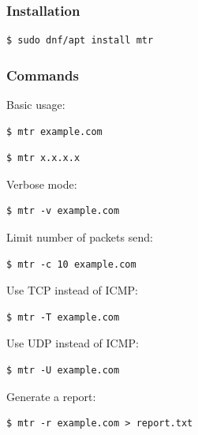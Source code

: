 \documentclass{article}
\newenvironment{codetemplate}[1][]{%
  \mybasecolorbox[#1]
  \itshape
}{%
  \endmybasecolorbox
}
\begin{document}
\subsubsection{Installation}

\begin{codetemplate}
\begin{verbatim}
$ sudo dnf/apt install mtr
\end{verbatim}
\end{codetemplate}

\subsubsection{Commands}

Basic usage:
\begin{codetemplate}
\begin{verbatim}
$ mtr example.com
\end{verbatim}
\end{codetemplate}
\begin{codetemplate}
\begin{verbatim}
$ mtr x.x.x.x
\end{verbatim}
\end{codetemplate}

Verbose mode:
\begin{codetemplate}
\begin{verbatim}
$ mtr -v example.com
\end{verbatim}
\end{codetemplate}

Limit number of packets send:
\begin{codetemplate}
\begin{verbatim}
$ mtr -c 10 example.com
\end{verbatim}
\end{codetemplate}

Use TCP instead of ICMP:
\begin{codetemplate}
\begin{verbatim}
$ mtr -T example.com
\end{verbatim}
\end{codetemplate}

Use UDP instead of ICMP:
\begin{codetemplate}
\begin{verbatim}
$ mtr -U example.com
\end{verbatim}
\end{codetemplate}

Generate a report:
\begin{codetemplate}
\begin{verbatim}
$ mtr -r example.com > report.txt
\end{verbatim}
\end{codetemplate}
\end{document}
